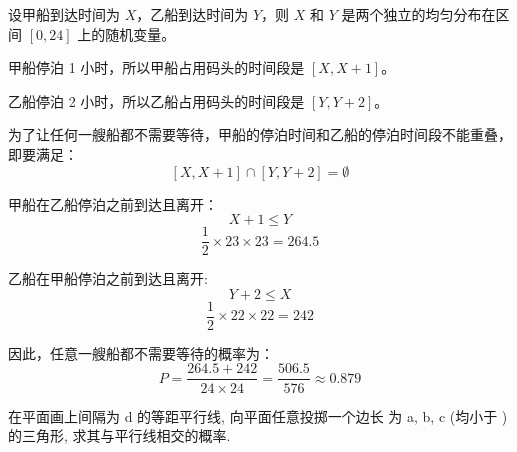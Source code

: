 \documentclass[twoside]{article}
\begin{document}
\begin{ans}{5}{5}

设甲船到达时间为 $X$，乙船到达时间为 $Y$，则 $X$ 和 $Y$ 是两个独立的均匀分布在区间 $[0, 24]$ 上的随机变量。

甲船停泊 1 小时，所以甲船占用码头的时间段是 $[X, X + 1]$。

乙船停泊 2 小时，所以乙船占用码头的时间段是 $[Y, Y + 2]$。

为了让任何一艘船都不需要等待，甲船的停泊时间和乙船的停泊时间段不能重叠，即要满足：
$$
[X, X + 1] \cap [Y, Y + 2] = \emptyset
$$

甲船在乙船停泊之前到达且离开：
$$ X + 1 \leq Y $$
$$ \frac{1}{2} \times 23 \times 23 = 264.5 $$

乙船在甲船停泊之前到达且离开:
$$ Y + 2 \leq X $$
$$ \frac{1}{2} \times 22 \times 22 = 242 $$

因此，任意一艘船都不需要等待的概率为：
$$
P = \frac{264.5 + 242}{24 \times 24} = \frac{506.5}{576} \approx 0.879
$$
\end{ans}

在平面画上间隔为 d 的等距平行线, 向平面任意投掷一个边长
为 a, b, c (均小于 ) 的三角形, 求其与平行线相交的概率.
\begin{ans}{6}{6}

\end{ans}

\newpage{}
\end{document}
